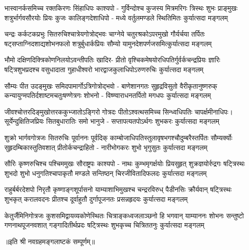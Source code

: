
\fourlineindentedshloka
{भास्वानर्कसमिच्च रक्तकिरणः सिंहाधिपः काश्यपो -}
{गुर्विन्दोश्च कुजस्य मित्रमरिगः त्रिस्थः शुभः प्राङ्मुखः}
{शत्रुर्भार्गवसौरयोः प्रियः कुजः कालिङ्गदेशाधिपो -}
{मध्ये वर्तुलमण्डले स्थितिमितः कुर्यात्सदा मङ्गलम्}

\fourlineindentedshloka
{चन्द्रः कर्कटकप्रभुः सितरुचिश्चात्रेयगोत्रोद्भवः}
{चाग्नेये चतुरश्रकोऽपरमुखो गौर्यर्चया तर्पितः}
{षट्सप्ताग्निदशाद्यशोभनफलो शत्रुर्बुधार्कप्रियः}
{सौम्यो यामुनदेशपर्णजसमित्कुर्यात्सदा मङ्गलम्}

\fourlineindentedshloka
{भौमो दक्षिणदिक्त्रिकोणनिलयोऽवन्तीपतिः खादिर-}
{प्रीतो वृश्चिकमेषयोरधिपतिर्गुर्वर्कचन्द्रप्रियः}
{ज्ञारिः षट्त्रिशुभप्रदश्च वसुधादाता गुहाधीश्वरो}
{भारद्वाजकुलाधिपोऽरुणरुचिः कुर्यात्सदा मङ्गलम्}

\fourlineindentedshloka
{सौम्यः पीत उदङ्मुखः समिदपामार्गोऽत्रिगोत्रोद्भवो -}
{बाणेशानगतः सुहृद्रविसुतो वैरीकृतानुष्णरुक्}
{कन्यायुग्मपतिर्दशाष्टमचतुःषण्णेत्रगः शोभनो -}
{विष्ण्वाराधनतर्पितो मगधपः कुर्यात्सदा मङ्गलम्}

\fourlineindentedshloka
{जीवश्चोत्तरदिङ्मुखोत्तरककुभ्जातोऽङ्गिरो गोत्रदः}
{पीतोऽश्वत्थसमिच्च सिन्ध्वधिपतिः चापर्क्षमीनाधिपः}।
{सूर्येन्दुक्षितिजप्रियः सितबुधारातिः समो भानुजे -}
{सप्तापत्यतपोऽर्थगः शुभकरः कुर्यात्सदा मङ्गलम्}

\fourlineindentedshloka
{शुक्रो भार्गवगोत्रजः सितरुचिः पूर्वाननः पूर्वदिक्}
{काम्बोजाधिपतिस्तुलावृषभगश्चौदुम्बरैस्तर्पितः}
{सौम्यर्क्योः सुहृदम्बिकास्तुतिवशात् प्रीतोर्कचन्द्राहितो -}
{नारीभोगकरः शुभो भृगुसुतः कुर्यात्सदा मङ्गलम्}

\fourlineindentedshloka
{सौरिः कृष्णरुचिश्च पश्चिममुखः सौराष्ट्रपः काश्यपो -}
{नाथः कुम्भमृगर्क्षयोः प्रियसुहृत् शुक्रज्ञयोर्रुद्रगः}
{षट्त्रिस्थः शुभदो शुभो  धनुगतिश्चापाकृतौ मण्डले}
{सन्तिष्ठन् चिरजीवितादिफलदः कुर्यात्सदा मङ्गलम्}

\fourlineindentedshloka
{राहुर्बर्बरदेशपो  निरृतौ कृष्णाङ्गशूर्पासनो}
{याम्याशाभिमुखश्च चन्द्ररविरुध् पैडीनसिः क्रौर्यवान्}
{षट्त्रिस्थः शुभकृत् करालवदनः प्रीतश्च दूर्वाहुतौ}
{दुर्गापूजनतः प्रसन्नहृदयः कुर्यात्सदा मङ्गलम्}

\fourlineindentedshloka
{केतुर्जैमिनिगोत्रजः कुशसमिद्वायव्यकोणेस्थितः}
{चित्राङ्कध्वजलाञ्छनो हि भगवान् याम्याननः शोभनः}
{सन्तुष्टो गणनाथपूजनवशात् गङ्गादितीर्थप्रदः}
{षट्त्रिस्थः शुभकृच्च चित्रिततनुः कुर्यात्सदा मङ्गलम्}

॥इति श्री नवग्रहमङ्गलाष्टकं सम्पूर्णम्॥